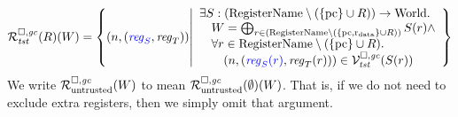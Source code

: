 \documentclass[a4paper]{article}
\begin{document}
\[
  \lrrg{\trust}(R)(W) = \left\{ \npair{\stpair{\reg}{\reg}} \middle|
    \begin{array}{l}
      \exists S : (\RegName \setminus (\{\pcreg \} \cup R))\fun \World \ldotp \\
      \quad W = \bigoplus_{r \in (\RegName\setminus (\{\pcreg,\rdata \} \cup R))} S(r) \wedge \\
      \quad \forall r \in \RegName \setminus (\{\pcreg \} \cup R)\ldotp\\
      \qquad\npair{\stpair[.]{\src{\reg_S(r)}}{\reg_T(r)}} \in \lrvg{\trust}(S(r))
    \end{array}
            \right\}
\]
We write $\mathcal{R}^{\square,\mathit{gc}}_{\mathrm{untrusted}}(W)$ to mean $\mathcal{R}^{\square,\mathit{gc}}_{\mathrm{untrusted}}(\emptyset)(W)$. That is, if we do not need to exclude extra registers, then we simply omit that argument.
\end{document}
